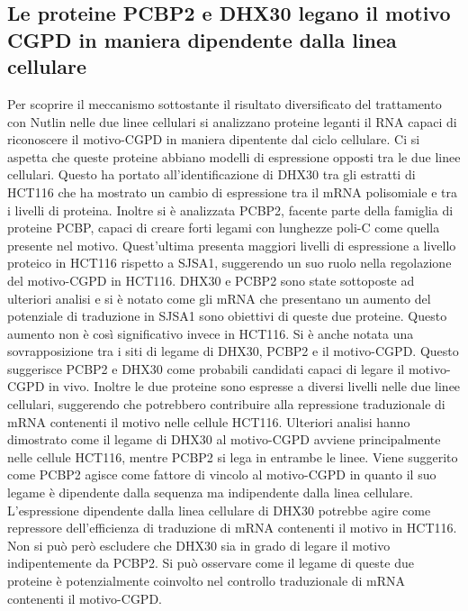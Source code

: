   \subsection{Le proteine PCBP2 e DHX30 legano il motivo CGPD in maniera dipendente dalla linea cellulare}
  Per scoprire il meccanismo sottostante il risultato diversificato del trattamento con Nutlin nelle due linee cellulari si analizzano proteine leganti il RNA capaci di riconoscere il motivo-CGPD in maniera dipentente dal ciclo cellulare.
  Ci si aspetta che queste proteine abbiano modelli di espressione opposti tra le due linee cellulari.
  Questo ha portato all'identificazione di DHX30 tra gli estratti di HCT116 che ha mostrato un cambio di espressione tra il mRNA polisomiale e tra i livelli di proteina.
  Inoltre si \`e analizzata PCBP2, facente parte della famiglia di proteine PCBP, capaci di creare forti legami con lunghezze poli-C come quella presente nel motivo.
  Quest'ultima presenta maggiori livelli di espressione a livello proteico in HCT116 rispetto a SJSA1, suggerendo un suo ruolo nella regolazione del motivo-CGPD in HCT116.
  DHX30 e PCBP2 sono state sottoposte ad ulteriori analisi e si \`e notato come gli mRNA che presentano un aumento del potenziale di traduzione in SJSA1 sono obiettivi di queste due proteine.
  Questo aumento non \`e cos\`i significativo invece in HCT116.
  Si \`e anche notata una sovrapposizione tra i siti di legame di DHX30, PCBP2 e il motivo-CGPD.
  Questo suggerisce PCBP2 e DHX30 come probabili candidati capaci di legare il motivo-CGPD in vivo.
  Inoltre le due proteine sono espresse a diversi livelli nelle due linee cellulari, suggerendo che potrebbero contribuire alla repressione traduzionale di mRNA contenenti il motivo nelle cellule HCT116.
  Ulteriori analisi hanno dimostrato come il legame di DHX30 al motivo-CGPD avviene principalmente nelle cellule HCT116, mentre PCBP2 si lega in entrambe le linee.
  Viene suggerito come PCBP2 agisce come fattore di vincolo al motivo-CGPD in quanto il suo legame \`e dipendente dalla sequenza ma indipendente dalla linea cellulare.
  L'espressione dipendente dalla linea cellulare di DHX30 potrebbe agire come repressore dell'efficienza di traduzione di mRNA contenenti il motivo in HCT116.
  Non si pu\`o per\`o escludere che DHX30 sia in grado di legare il motivo indipentemente da PCBP2.
  Si pu\`o osservare come il legame di queste due proteine \`e potenzialmente coinvolto nel controllo traduzionale di mRNA contenenti il motivo-CGPD.

